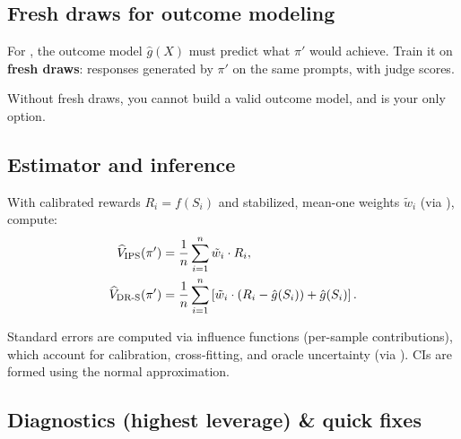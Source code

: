 \subsection{Fresh draws for outcome modeling}

For \dr, the outcome model $\hat{g}(X)$ must predict what $\pi'$ would achieve. Train it on \textbf{fresh draws}: responses generated by $\pi'$ on the same prompts, with judge scores.

Without fresh draws, you cannot build a valid outcome model, and \ips{} is your only option.

\subsection{Estimator and inference}

With calibrated rewards $R_i = f(S_i)$ and stabilized, mean-one weights $\tilde{w}_i$ (via \simcal), compute:
\begin{align}
\widehat{V}_{\text{IPS}}(\pi') &= \frac{1}{n} \sum_{i=1}^n \tilde{w}_i \cdot R_i, \\
\widehat{V}_{\text{DR-S}}(\pi') &= \frac{1}{n} \sum_{i=1}^n \left[ \tilde{w}_i \cdot (R_i - \hat{g}(S_i)) + \hat{g}(S_i) \right].
\end{align}

Standard errors are computed via influence functions (per-sample contributions), which account for calibration, cross-fitting, and oracle uncertainty (via \oua). CIs are formed using the normal approximation.

\subsection{Diagnostics (highest leverage) \& quick fixes}

